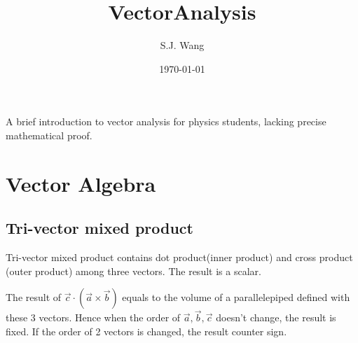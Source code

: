 \documentclass[a4paper]{article}
\title{VectorAnalysis}
\author{S.J. Wang}
\date{\today}
\begin{document}
    \maketitle

    A brief introduction to vector analysis for physics students, lacking precise mathematical proof.

    \newpage

    \tableofcontents

    \newpage

    \section{Vector Algebra}
    \subsection{Tri-vector mixed product}

    Tri-vector mixed product contains dot product(inner product) and cross product (outer product) among three vectors. The result is a scalar.


    The result of $\vec{c}\cdot(\vec{a}\times \vec{b})$ equals to the volume of a parallelepiped defined with these 3 vectors. Hence when the order of $\vec{a},\vec{b}, \vec{c}$ doesn't change, the result is fixed. If the order of 2 vectors is changed, the result counter sign.


    
\end{document}
